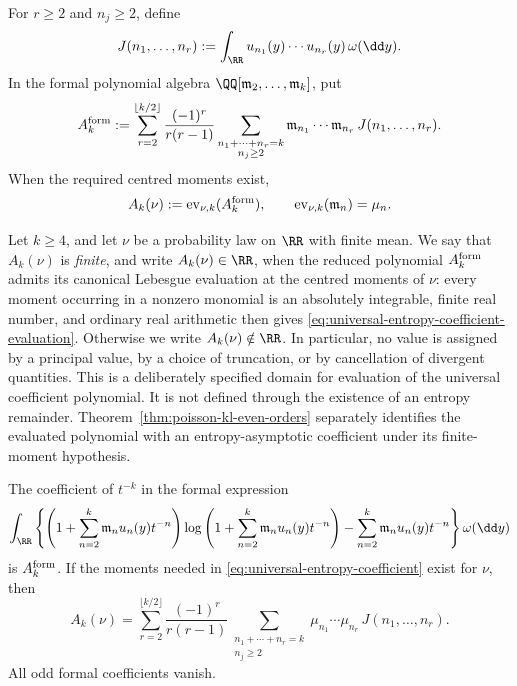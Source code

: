 For \(r\ge2\) and \(n_j\ge2\), define
\begin{equation}\label{eq:mode-integral-definition}
J(n_1,\ldots,n_r):=
\int_{\RR}u_{n_1}(y)\cdots u_{n_r}(y)\,\omega(\dd y).
\end{equation}
In the formal polynomial algebra
\(\QQ[\mathfrak m_2,\ldots,\mathfrak m_k]\), put
\begin{equation}\label{eq:universal-entropy-coefficient}
A_k^{\rm form}:=
\sum_{r=2}^{\lfloor k/2\rfloor}
\frac{(-1)^r}{r(r-1)}
\sum_{\substack{n_1+\cdots+n_r=k\\ n_j\ge2}}
\mathfrak m_{n_1}\cdots\mathfrak m_{n_r}\,J(n_1,\ldots,n_r).
\end{equation}
When the required centred moments exist,
\begin{equation}\label{eq:universal-entropy-coefficient-evaluation}
A_k(\nu):=\operatorname{ev}_{\nu,k}(A_k^{\rm form}),
\qquad
\operatorname{ev}_{\nu,k}(\mathfrak m_n)=\mu_n .
\end{equation}

\begin{definition}
\label{def:canonical-coefficient-finiteness}
Let \(k\ge4\), and let \(\nu\) be a probability law on \(\RR\) with finite
mean.  We say that \(A_k(\nu)\) is \emph{finite}, and write
\(A_k(\nu)\in\RR\), when the reduced polynomial
\(A_k^{\rm form}\) admits its canonical Lebesgue evaluation at the centred
moments of \(\nu\): every moment occurring in a nonzero monomial is an
absolutely integrable, finite real number, and ordinary real arithmetic then
gives \eqref{eq:universal-entropy-coefficient-evaluation}.  Otherwise we
write \(A_k(\nu)\notin\RR\).  In particular, no value is assigned by a
principal value, by a choice of truncation, or by cancellation of divergent
quantities.  This is a deliberately specified domain for evaluation of the
universal coefficient polynomial.  It is not defined through the existence
of an entropy remainder.  Theorem~\ref{thm:poisson-kl-even-orders} separately
identifies the evaluated polynomial with an entropy-asymptotic coefficient
under its finite-moment hypothesis.
\end{definition}

\begin{theorem}%
\label{thm:universal-entropy-coefficients}
The coefficient of \(t^{-k}\) in the formal expression
\[
\int_{\RR}\left\{
\left(1+\sum_{n=2}^{k}\mathfrak m_nu_n(y)t^{-n}\right)
\log\left(1+\sum_{n=2}^{k}\mathfrak m_nu_n(y)t^{-n}\right)
-\sum_{n=2}^{k}\mathfrak m_nu_n(y)t^{-n}
\right\}\omega(\dd y)
\]
is \(A_k^{\rm form}\).  If the moments needed in
\eqref{eq:universal-entropy-coefficient} exist for \(\nu\), then
\[
A_k(\nu)=
\sum_{r=2}^{\lfloor k/2\rfloor}
\frac{(-1)^r}{r(r-1)}
\sum_{\substack{n_1+\cdots+n_r=k\\ n_j\ge2}}
\mu_{n_1}\cdots\mu_{n_r}\,J(n_1,\ldots,n_r).
\]
All odd formal coefficients vanish.
\end{theorem}


